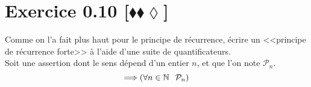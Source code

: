 \documentclass[10pt]{article}
\begin{document}
\section*{Exercice 0.10 [$\blacklozenge\blacklozenge\lozenge$]}
\begin{tcolorbox}[enhanced, width=6in, center, size=fbox, fontupper=\large, drop shadow southwest]
    Comme on l'a fait plus haut pour le principe de récurrence, écrire un <<principe de récurrence forte>> à l'aide d'une suite de quantificateurs.\\
    Soit une assertion dont le sens dépend d'un entier $n$, et que l'on note $\mathcal{P}_n$.
    \begin{equation*}
        [\forall{n\in\mathbb{N} \hspace{0.25cm}}(\forall{k\in[0, n] \hspace{0.25cm} \mathcal{P}_k}) \Rightarrow \mathcal{P}_{n+1}] \Longrightarrow (\forall{n\in\mathbb{N}} \hspace{0.25cm} \mathcal{P}_n)
    \end{equation*}
\end{tcolorbox}
\end{document}
